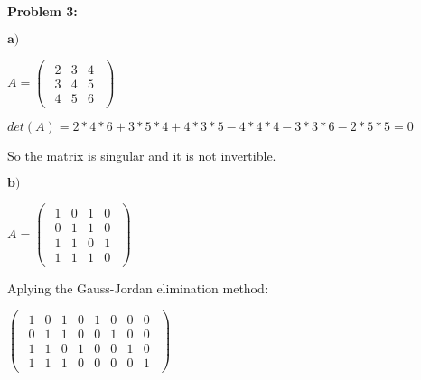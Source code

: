 \textbf{Problem 3:}

\singlespacing

$\textbf{a)}$

\singlespacing

\begin{math}
    A=\begin{pmatrix}
        \begin{array}{ccc}
            2 & 3 & 4 \\
            3 & 4 & 5 \\
            4 & 5 & 6
        \end{array}
    \end{pmatrix}
\end{math}

\singlespacing

\begin{math}
    det(A) = 2*4*6 + 3*5*4 + 4*3*5 - 4*4*4 - 3*3*6 - 2*5*5 = 0
\end{math}

\singlespacing

So the matrix is singular and it is not invertible.

\singlespacing

\singlespacing

$\textbf{b)}$

\singlespacing

\begin{math}
    A = \begin{pmatrix}
        \begin{array}{cccc}
            1 & 0 & 1 & 0 \\
            0 & 1 & 1 & 0 \\
            1 & 1 & 0 & 1 \\
            1 & 1 & 1 & 0
        \end{array}
    \end{pmatrix}
\end{math}

\singlespacing

Aplying the Gauss-Jordan elimination method:

\singlespacing
\singlespacing

\begin{math}
    \begin{pmatrix}
        \begin{array}{cccc|cccc}
            1 & 0 & 1 & 0 & 1 & 0 & 0 & 0 \\
            0 & 1 & 1 & 0 & 0 & 1 & 0 & 0 \\
            1 & 1 & 0 & 1 & 0 & 0 & 1 & 0 \\
            1 & 1 & 1 & 0 & 0 & 0 & 0 & 1
        \end{array}
    \end{pmatrix}
\end{math}

